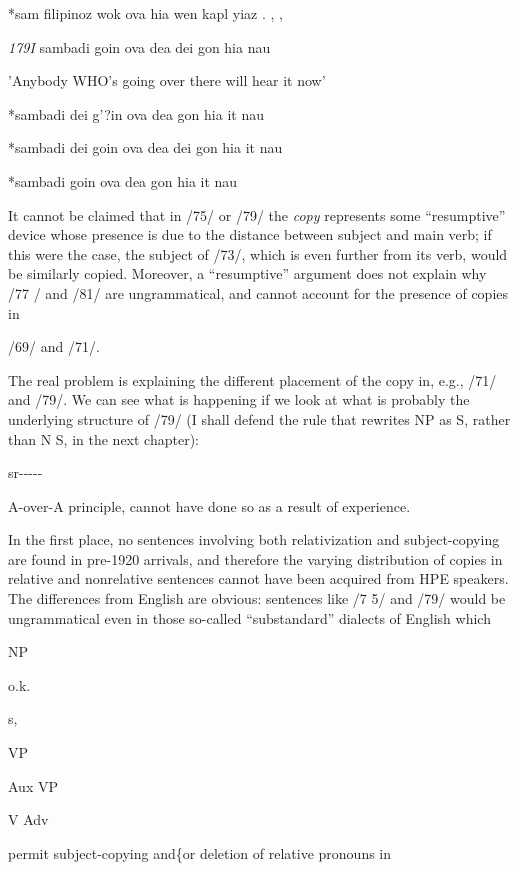 \ea\label{ex:78}
*sam filipinoz wok ova hia wen kapl yiaz . , ,
\glt
\z

\textit{17}\textit{9}\textit{I }sambadi goin ova dea dei gon hia nau

'Anybody WHO's going over there will hear it now'

\ea\label{ex:80}
*sambadi dei g'?in ova dea gon hia it nau
\glt
\z

\ea\label{ex:81}
*sambadi dei goin ova dea dei gon hia it nau
\glt
\z

\ea\label{ex:82}
*sambadi goin ova dea gon hia it nau
\glt
\z

It cannot be claimed that in /75/ or /79/ the \textit{c}\textit{o}\textit{py }represents some ``resumptive'' device whose presence is due to the distance be\-tween subject and main verb; if this were the case, the subject of /73/, which is even further from its verb, would be similarly copied. More\-over, a ``resumptive'' argument does not explain why /77 / and /81/ are ungrammatical, and cannot account for the presence of copies in

/69/ and /71/.


The real problem is explaining the different placement of the copy in, e.g., /71/ and /79/. We can see what is happening if we look at what is probably the underlying structure of /79/ (I shall defend the rule that rewrites NP as S, rather than N S, in the next chapter):

\ea\label{ex:83}
sr-{}-{}-{}-{}-
\glt
\z


A-over-A principle, cannot have done so as a result of experience.

In the first place, no sentences involving both relativization and subject-copying are found in pre-1920 arrivals, and therefore the varying distribution of copies in relative and nonrelative sentences cannot have been acquired from HPE speakers. The differences from English are obvious: sentences like /7 5/ and /79/ would be ungramma\-tical even in those so-called ``substandard'' dialects of English which

NP

o.k.

s,

VP

Aux VP

V Adv

permit subject-copying and\{or deletion of relative pronouns in

